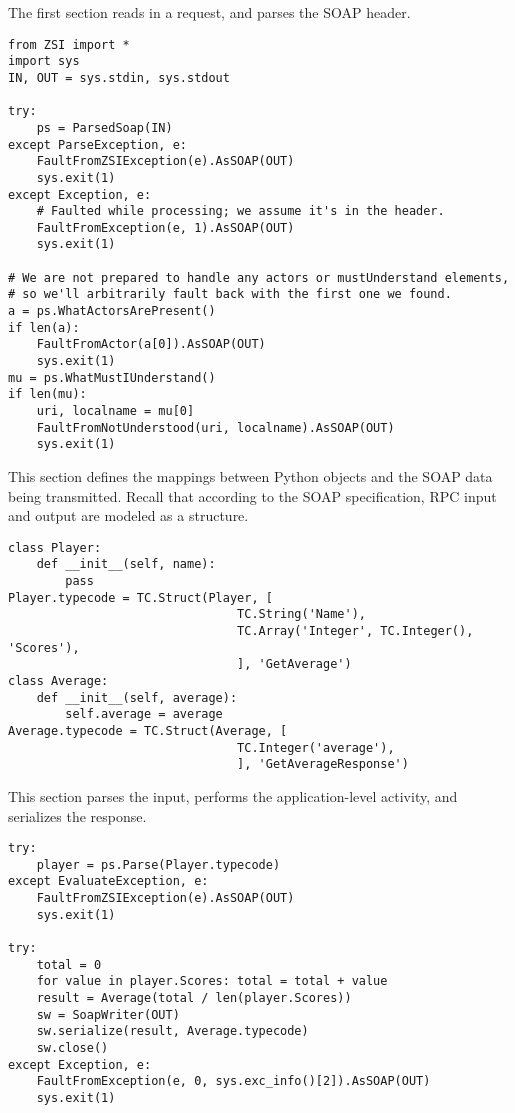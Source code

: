 The first section reads in a request, and parses the SOAP header.

\begin{verbatim}
from ZSI import *
import sys
IN, OUT = sys.stdin, sys.stdout

try:
    ps = ParsedSoap(IN)
except ParseException, e:
    FaultFromZSIException(e).AsSOAP(OUT)
    sys.exit(1)
except Exception, e:
    # Faulted while processing; we assume it's in the header.
    FaultFromException(e, 1).AsSOAP(OUT)
    sys.exit(1)

# We are not prepared to handle any actors or mustUnderstand elements,
# so we'll arbitrarily fault back with the first one we found.
a = ps.WhatActorsArePresent()
if len(a):
    FaultFromActor(a[0]).AsSOAP(OUT)
    sys.exit(1)
mu = ps.WhatMustIUnderstand()
if len(mu):
    uri, localname = mu[0]
    FaultFromNotUnderstood(uri, localname).AsSOAP(OUT)
    sys.exit(1)
\end{verbatim}

This section defines the mappings between Python objects and the SOAP
data being transmitted.
Recall that according to the SOAP specification, RPC input and output
are modeled as a structure.

\begin{verbatim}
class Player:
    def __init__(self, name):
        pass
Player.typecode = TC.Struct(Player, [
                                TC.String('Name'),
                                TC.Array('Integer', TC.Integer(), 'Scores'),
                                ], 'GetAverage')
class Average:
    def __init__(self, average):
        self.average = average
Average.typecode = TC.Struct(Average, [
                                TC.Integer('average'),
                                ], 'GetAverageResponse')
\end{verbatim}

This section parses the input, performs the application-level
activity, and serializes the response.
\begin{verbatim}
try:
    player = ps.Parse(Player.typecode)
except EvaluateException, e:
    FaultFromZSIException(e).AsSOAP(OUT)
    sys.exit(1)

try:
    total = 0
    for value in player.Scores: total = total + value
    result = Average(total / len(player.Scores))
    sw = SoapWriter(OUT)
    sw.serialize(result, Average.typecode)
    sw.close()
except Exception, e:
    FaultFromException(e, 0, sys.exc_info()[2]).AsSOAP(OUT)
    sys.exit(1)
\end{verbatim}

